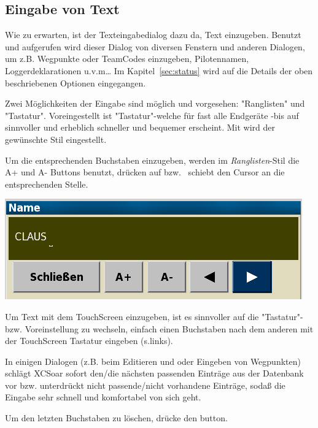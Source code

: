 \subsection*{Eingabe von Text} \label{sec:textentry}

Wie zu erwarten, ist der Texteingabedialog dazu da, Text einzugeben.
Benutzt und aufgerufen wird dieser Dialog von diversen Fenstern und anderen Dialogen, um z.B. Wegpunkte oder TeamCodes  einzugeben, Pilotennamen, Loggerdeklarationen u.v.m\dots
Im Kapitel~\ref{sec:status} wird auf die Details der oben beschriebenen Optionen eingegangen.

 Zwei Möglichkeiten der Eingabe sind möglich und vorgesehen:  "Ranglisten"  und "Tastatur".
Voreingestellt ist "Tastatur"-welche für fast alle Endgeräte -bis auf \al sinnvoller und erheblich schneller und bequemer erscheint. Mit  wird der gewünschte Stil eingestellt.

Um die entsprechenden  Buchstaben einzugeben, werden im \textit{Ranglisten}-Stil die A+ und  A- Buttons benutzt, drücken auf  \button{$<$} bzw.\   \button{$>$} schiebt den Cursor an die entsprechenden Stelle.
 
\begin{center}
\includegraphics[angle=0,width=0.65\linewidth,keepaspectratio='true']{figures/textentry.png}
\end{center}

Um Text mit dem TouchScreen einzugeben, ist es sinnvoller  auf die "Tastatur"- bzw. Voreinstellung zu wechseln, einfach einen Buchstaben nach dem anderen mit der TouchScreen Tastatur eingeben (s.links).

In einigen Dialogen (z.B. beim Editieren und oder Eingeben von Wegpunkten) schlägt \textsf{XCSoar} sofort den/die nächsten passenden Einträge aus der Datenbank vor bzw. unterdrückt nicht passende/nicht vorhandene Einträge, sodaß die Eingabe sehr schnell und komfortabel von sich geht.

Um den letzten Buchstaben zu löschen, drücke den  \button{$<-$} button.

